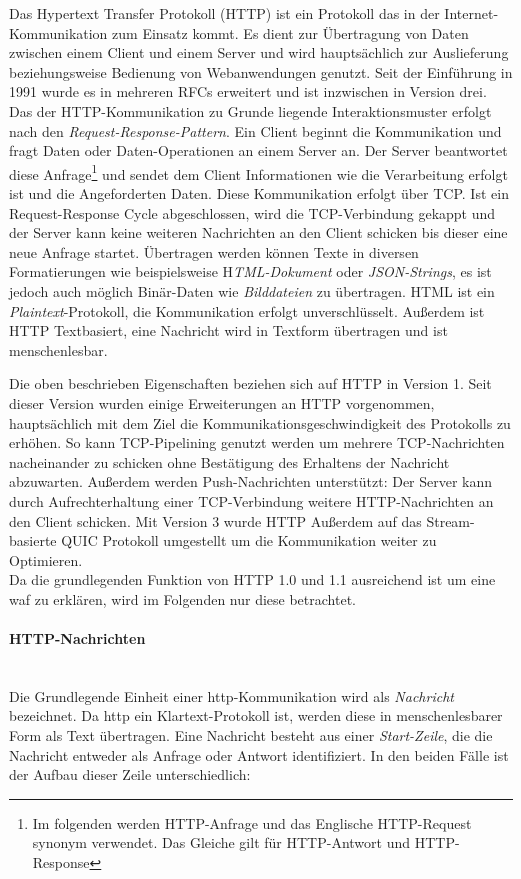Das Hypertext Transfer Protokoll (HTTP) ist ein Protokoll das in der Internet-Kommunikation zum Einsatz kommt.
Es dient zur Übertragung von Daten zwischen einem Client und einem Server und wird hauptsächlich zur Auslieferung beziehungsweise Bedienung von Webanwendungen genutzt.
Seit der Einführung in 1991 wurde es in mehreren RFCs erweitert und ist inzwischen in Version drei\cite{onlineIETFErhebtHTTP2022}.\\

Das der HTTP-Kommunikation zu Grunde liegende Interaktionsmuster erfolgt nach den \textit{Request-Response-Pattern}.
Ein Client beginnt die Kommunikation und fragt Daten oder Daten-Operationen an einem Server an.
Der Server beantwortet diese Anfrage\footnote{Im folgenden werden HTTP-Anfrage und das Englische HTTP-Request synonym verwendet. Das Gleiche gilt für HTTP-Antwort und HTTP-Response} und sendet dem Client Informationen wie die Verarbeitung erfolgt ist und die Angeforderten Daten.
Diese Kommunikation erfolgt über TCP.
Ist ein Request-Response Cycle abgeschlossen, wird die TCP-Verbindung gekappt und der Server kann keine weiteren Nachrichten an den Client schicken bis dieser eine neue Anfrage startet.
Übertragen werden können Texte in diversen Formatierungen wie beispielsweise H\textit{TML-Dokument} oder \textit{JSON-Strings}, es ist jedoch auch möglich Binär-Daten wie \textit{Bilddateien} zu übertragen.
HTML ist ein \textit{Plaintext}-Protokoll, die Kommunikation erfolgt unverschlüsselt.
Außerdem ist HTTP Textbasiert, eine Nachricht wird in Textform übertragen und ist menschenlesbar.

Die oben beschrieben Eigenschaften beziehen sich auf HTTP in Version 1.
Seit dieser Version wurden einige Erweiterungen an HTTP vorgenommen, hauptsächlich mit dem Ziel die Kommunikationsgeschwindigkeit des Protokolls zu erhöhen.
So kann TCP-Pipelining genutzt werden um mehrere TCP-Nachrichten nacheinander zu schicken ohne Bestätigung des Erhaltens der Nachricht abzuwarten.
Außerdem werden Push-Nachrichten unterstützt:
Der Server kann durch Aufrechterhaltung einer TCP-Verbindung weitere HTTP-Nachrichten an den Client schicken.
Mit Version 3 wurde HTTP Außerdem auf das Stream-basierte QUIC Protokoll umgestellt um die Kommunikation weiter zu Optimieren\cite{OverviewHTTPHTTP2023}.\\

Da die grundlegenden Funktion von HTTP 1.0 und 1.1 ausreichend ist um eine \ac{waf} zu erklären, wird im Folgenden nur diese betrachtet.

\paragraph{HTTP-Nachrichten \cite{HTTPMessagesHTTP2024}}
\ \\
Die Grundlegende Einheit einer \ac{http}-Kommunikation wird als \textit{Nachricht} bezeichnet.
Da \ac{http} ein Klartext-Protokoll ist, werden diese in menschenlesbarer Form als Text übertragen.
Eine Nachricht besteht aus einer \textit{Start-Zeile}, die die Nachricht entweder als Anfrage oder Antwort identifiziert.
In den beiden Fälle ist der Aufbau dieser Zeile unterschiedlich:

